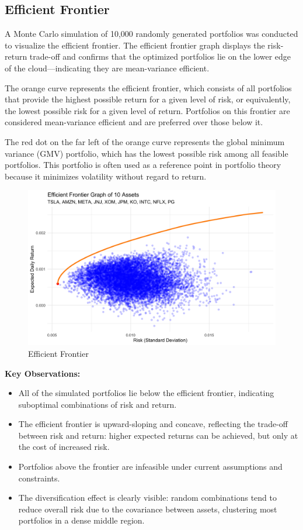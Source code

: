 \documentclass[12pt]{article}
\begin{document}
\subsection*{Efficient Frontier}
A Monte Carlo simulation of 10,000 randomly generated portfolios was conducted to visualize the efficient frontier. The efficient frontier graph displays the risk-return trade-off and confirms that the optimized portfolios lie on the lower edge of the cloud—indicating they are mean-variance efficient.\par
The orange curve represents the efficient frontier, which consists of all portfolios that provide the highest possible return for a given level of risk, or equivalently, the lowest possible risk for a given level of return. Portfolios on this frontier are considered mean-variance efficient and are preferred over those below it.\par
The red dot on the far left of the orange curve represents the global minimum variance (GMV) portfolio, which has the lowest possible risk among all feasible portfolios. This portfolio is often used as a reference point in portfolio theory because it minimizes volatility without regard to return.\\
\begin{figure}[H]
    \centering
    \includegraphics[width=0.6\linewidth]{Findings_Yutong/efficient_frontier_plot.png}
    \caption{Efficient Frontier}
    \label{eff-fro}
\end{figure}
\textbf{Key Observations:}
\begin{itemize}
    \item All of the simulated portfolios lie below the efficient frontier, indicating suboptimal combinations of risk and return.
    \item The efficient frontier is upward-sloping and concave, reflecting the trade-off between risk and return: higher expected returns can be achieved, but only at the cost of increased risk.
    \item Portfolios above the frontier are infeasible under current assumptions and constraints.
    \item The diversification effect is clearly visible: random combinations tend to reduce overall risk due to the covariance between assets, clustering most portfolios in a dense middle region.
\end{itemize}
\end{document}
